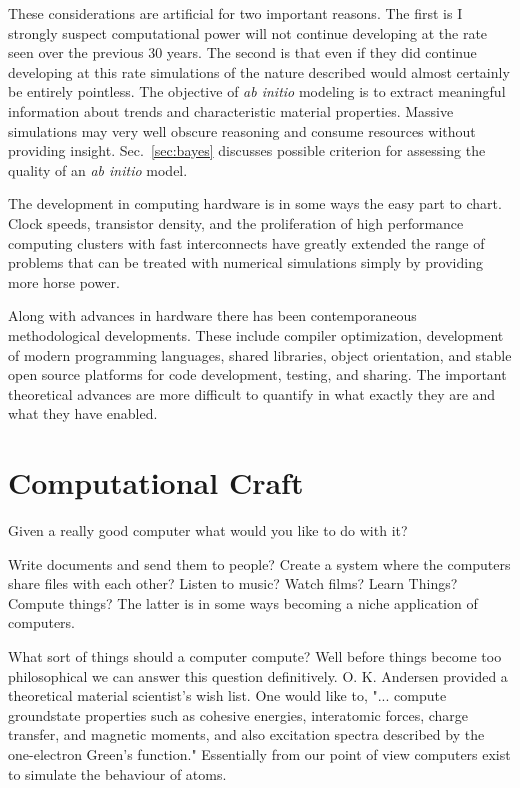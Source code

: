 These considerations are artificial for two important reasons. The first
is I strongly suspect computational power will not continue developing at the rate
seen over the previous 30 years. The second is that even if they did continue developing
at this rate simulations of the nature described would almost certainly be entirely pointless.
The objective of {\it ab initio} modeling is to extract meaningful information
about trends and characteristic material properties. Massive simulations may very
well obscure reasoning and consume resources without providing insight. Sec.~\ref{sec:bayes}
discusses possible criterion for assessing the quality of an {\it ab initio} model. 


The development in computing hardware is in some ways the easy part to chart. 
Clock speeds, transistor density, and the proliferation of high 
performance computing clusters with fast interconnects have greatly extended 
the range of problems that can be treated with numerical simulations
simply by providing more horse power.

Along with advances in hardware there has been contemporaneous methodological developments.
These include compiler optimization, development of modern programming languages, 
shared libraries, object orientation, and stable open source platforms for 
code development, testing, and sharing. The important theoretical
advances are more difficult to quantify in what exactly they are and what they have enabled.

\section{Computational Craft}
Given a really good computer what would you like to do with it?

Write documents and send them to people? Create a system where the computers share files
with each other? Listen to music? Watch films? Learn Things? Compute things? The latter is in some
ways becoming a niche application of computers.

What sort of things should a computer compute? Well before things become too philosophical we
can answer this question definitively.
O. K. Andersen provided a theoretical material scientist's wish list. One would like to,
"... compute groundstate properties such as cohesive energies, interatomic forces, charge transfer, and magnetic moments,
and also excitation spectra described by the one-electron Green's function." \cite{anderson75} 
Essentially from our point of view computers exist to simulate the behaviour of atoms.

